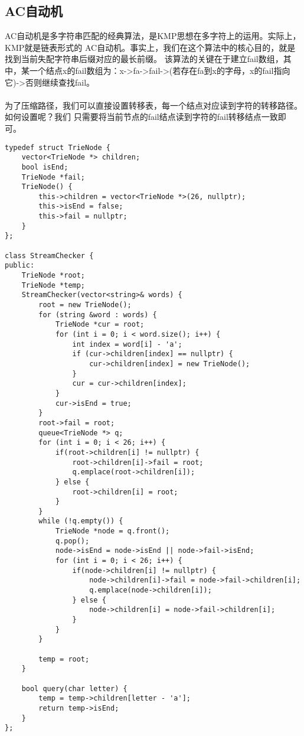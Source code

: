 \documentclass[12pt,a4paper,UTF16]{ctexbook}
\theoremstyle{plain}
\begin{document}
\subsection{AC自动机}
AC自动机是多字符串匹配的经典算法，是KMP思想在多字符上的运用。实际上，KMP就是链表形式的
AC自动机。事实上，我们在这个算法中的核心目的，就是找到当前失配字符串后缀对应的最长前缀。
该算法的关键在于建立fail数组，其中，某一个结点x的fail数组为：x->fa->fail->(若存在fa到x的字母，x的fail指向它)->否则继续查找fail。
\paragraph{}为了压缩路径，我们可以直接设置转移表，每一个结点对应读到字符的转移路径。如何设置呢？我们
只需要将当前节点的fail结点读到字符的fail转移结点一致即可。
\begin{lstlisting}
typedef struct TrieNode {
    vector<TrieNode *> children;
    bool isEnd;
    TrieNode *fail;
    TrieNode() {
        this->children = vector<TrieNode *>(26, nullptr);
        this->isEnd = false;
        this->fail = nullptr;
    }
};

class StreamChecker {
public:
    TrieNode *root;
    TrieNode *temp;
    StreamChecker(vector<string>& words) {
        root = new TrieNode();
        for (string &word : words) {
            TrieNode *cur = root;
            for (int i = 0; i < word.size(); i++) {
                int index = word[i] - 'a';
                if (cur->children[index] == nullptr) {
                    cur->children[index] = new TrieNode();
                }
                cur = cur->children[index];
            }
            cur->isEnd = true;
        }
        root->fail = root;
        queue<TrieNode *> q;
        for (int i = 0; i < 26; i++) {
            if(root->children[i] != nullptr) {
                root->children[i]->fail = root;
                q.emplace(root->children[i]);
            } else {
                root->children[i] = root;
            }
        }
        while (!q.empty()) {
            TrieNode *node = q.front();
            q.pop();
            node->isEnd = node->isEnd || node->fail->isEnd;
            for (int i = 0; i < 26; i++) {
                if(node->children[i] != nullptr) {
                    node->children[i]->fail = node->fail->children[i];
                    q.emplace(node->children[i]);
                } else {
                    node->children[i] = node->fail->children[i];
                }
            }
        }

        temp = root;
    }
    
    bool query(char letter) {
        temp = temp->children[letter - 'a'];
        return temp->isEnd;
    }
};
\end{lstlisting}
\end{document}
